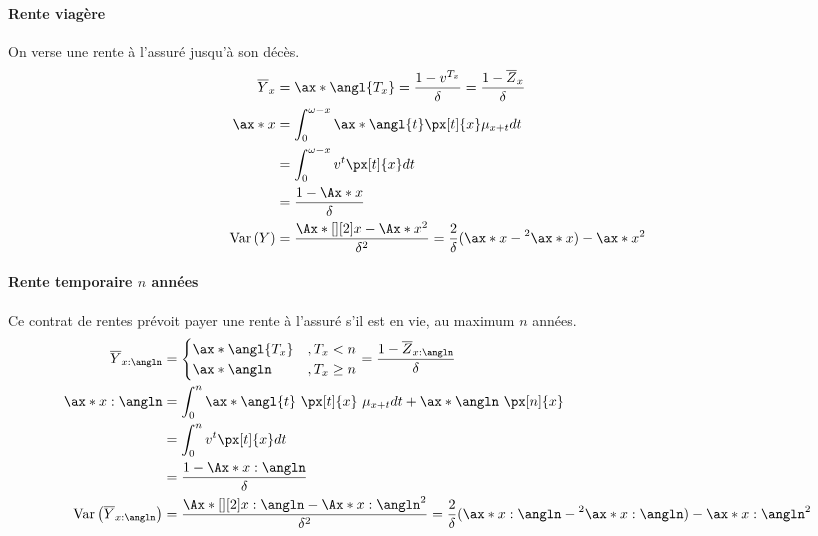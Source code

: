 \documentclass[10pt, french]{article}
\begin{document}
\begin{multicols*}{3}
\paragraph{Rente viagère} On verse une rente à l'assuré jusqu'à son décès. 
\begin{align*}
\overline{Y}_{x}	&  = \ax*{\angl{T_{x}}} = \frac{1-v^{T_x}}{\delta} = \frac{1 -\overline{Z}_x}{\delta} \\
\ax*{x} 
	& = \int_{0}^{\omega - x}  \ax*{\angl{t}}  \px[t]{x} \mu_{x+t} dt \\
	& = \int_{0}^{\omega - x} v^t \px[t]{x} dt \\
	& = \frac{1 - \Ax*{x}}{\delta} \\
\variance{Y}	 
	&=	\frac{\Ax*[][2]{x} - \Ax*{x}^2}{\delta^2} 
	=	\frac{2}{\delta} (\ax*{x} - \prescript{2}{}{\ax*{x}}) - \ax*{x}^2
\end{align*}

\paragraph{Rente temporaire $n$ années} Ce contrat de rentes prévoit payer une rente à l'assuré s'il est en vie, au maximum $n$ années.
\begin{align*}
\overline{Y}_{x:\angln} & = \begin{cases}
\ax*{\angl{T_x}}	& , T_x < n \\
\ax*{\angln}			& , T_x \geq n \\
\end{cases} 
= \frac{1  - \overline{Z}_{x:\angln}}{\delta} \\
\ax*{x:\angln}	
	& = \int_{0}^{n} \ax*{\angl{t}} \  \px[t]{x} \  \mu_{x+t} dt + \ax*{\angln} \ \px[n]{x} \\
	& = \int_{0}^{n} v^t \px[t]{x} dt \\
	& = \frac{1 - \Ax*{x:\angln}}{\delta} \\
\variance{\overline{Y}_{x:\angln}}	
	& = 	\frac{\Ax*[][2]{x:\angln} - \Ax*{x:\angln}^2}{\delta^2} 
	=	\frac{2}{\delta} (\ax*{x:\angln} - \prescript{2}{}{\ax*{x:\angln}}) - \ax*{x:\angln}^2
\end{align*}


\end{multicols*}
\end{document}
